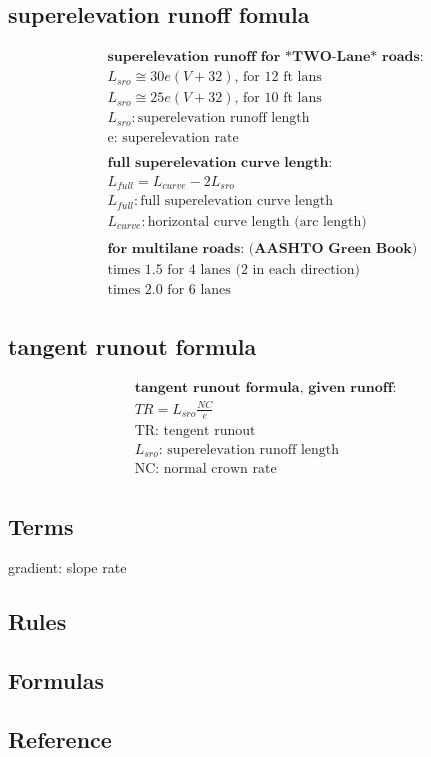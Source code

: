 \documentclass{article}
\begin{document}
  \subsection{superelevation runoff fomula}
  \begin{align*}
    & \textbf{superelevation runoff for *TWO-Lane* roads:} \\
    & L_{sro} \cong 30e(V + 32) \text{, for 12 ft lans} \\
    & L_{sro} \cong 25e(V + 32) \text{, for 10 ft lans} \\
    & L_{sro}: \text{superelevation runoff length} \\
    & \text{e: superelevation rate} \\
    \\
    & \textbf{full superelevation curve length:}\\
    & L_{full} = L_{curve} - 2L_{sro} \\
    & L_{full}: \text{full superelevation curve length} \\
    & L_{curve}: \text{horizontal curve length (arc length)} \\
    \\
    & \textbf{for multilane roads: (AASHTO Green Book) } \\
    & \text{times 1.5 for 4 lanes (2 in each direction)} \\
    & \text{times 2.0 for 6 lanes } \\
  \end{align*}

  \subsection{tangent runout formula}
  \begin{align*}
  & \textbf{tangent runout formula, given runoff:} \\
  & TR = L_{sro} \frac{NC}{e} \\
  & \text{TR: tengent runout} \\
  & \text{$L_{sro}$: superelevation runoff length} \\
  & \text{NC: normal crown rate} \\
  \end{align*}


  \subsection{Terms}
  gradient: slope rate

  \subsection{Rules}

  \subsection{Formulas}

  \subsection{Reference}


\end{document}
